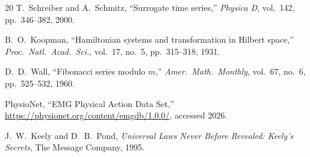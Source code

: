 \documentclass[11pt,a4paper]{article}
\begin{document}
\begin{thebibliography}{20}
T.~Schreiber and A.~Schmitz, ``Surrogate time series,''
\emph{Physica D}, vol.~142, pp.~346--382, 2000.

B.~O.~Koopman, ``Hamiltonian systems and transformation in Hilbert
space,'' \emph{Proc.\ Natl.\ Acad.\ Sci.}, vol.~17, no.~5,
pp.~315--318, 1931.

D.~D.~Wall, ``Fibonacci series modulo $m$,'' \emph{Amer.\ Math.\
Monthly}, vol.~67, no.~6, pp.~525--532, 1960.

PhysioNet, ``EMG Physical Action Data Set,''
\url{https://physionet.org/content/emgdb/1.0.0/}, accessed 2026.

J.~W.~Keely and D.~B.~Pond, \emph{Universal Laws Never Before
Revealed: Keely's Secrets}, The Message Company, 1995.

\end{thebibliography}
\end{document}
